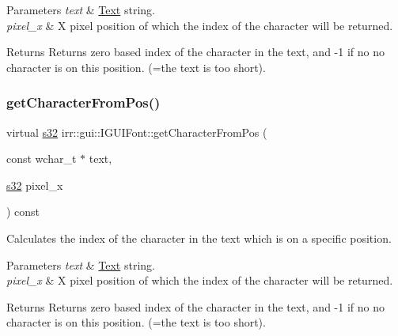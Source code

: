 \begin{DoxyParams}{Parameters}
{\em text} & \hyperlink{classText}{Text} string. \\
\hline
{\em pixel\+\_\+x} & X pixel position of which the index of the character will be returned. \\
\hline
\end{DoxyParams}
\begin{DoxyReturn}{Returns}
Returns zero based index of the character in the text, and -\/1 if no no character is on this position. (=the text is too short). 
\end{DoxyReturn}
\mbox{\label{classirr_1_1gui_1_1IGUIFont_a60d4d0465deedd811cd0fecd11b4329f}} 
\subsubsection{\texorpdfstring{get\+Character\+From\+Pos()}{getCharacterFromPos()}\hspace{0.1cm}{\footnotesize\ttfamily [2/2]}}
{\footnotesize\ttfamily virtual \hyperlink{namespaceirr_ac66849b7a6ed16e30ebede579f9b47c6}{s32} irr\+::gui\+::\+I\+G\+U\+I\+Font\+::get\+Character\+From\+Pos (\begin{DoxyParamCaption}\item[{const wchar\+\_\+t $\ast$}]{text,  }\item[{\hyperlink{namespaceirr_ac66849b7a6ed16e30ebede579f9b47c6}{s32}}]{pixel\+\_\+x }\end{DoxyParamCaption}) const\hspace{0.3cm}{\ttfamily [pure virtual]}}



Calculates the index of the character in the text which is on a specific position. 


\begin{DoxyParams}{Parameters}
{\em text} & \hyperlink{classText}{Text} string. \\
\hline
{\em pixel\+\_\+x} & X pixel position of which the index of the character will be returned. \\
\hline
\end{DoxyParams}
\begin{DoxyReturn}{Returns}
Returns zero based index of the character in the text, and -\/1 if no no character is on this position. (=the text is too short). 
\end{DoxyReturn}
\mbox{\label{classirr_1_1gui_1_1IGUIFont_aa7612db0c9dc2837b44a1a2fa5668797}} 
